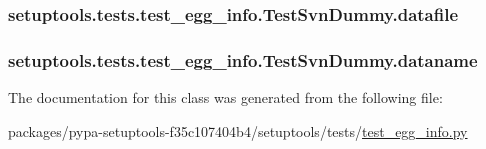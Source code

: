 \subsubsection[{datafile}]{\setlength{\rightskip}{0pt plus 5cm}setuptools.\+tests.\+test\+\_\+egg\+\_\+info.\+Test\+Svn\+Dummy.\+datafile}\label{classsetuptools_1_1tests_1_1test__egg__info_1_1TestSvnDummy_ab48d19e4661cfb140e463bf64197c0cc}
\hypertarget{classsetuptools_1_1tests_1_1test__egg__info_1_1TestSvnDummy_a09528b03ea5f267c9697f4e43770e13d}{}
\subsubsection[{dataname}]{\setlength{\rightskip}{0pt plus 5cm}setuptools.\+tests.\+test\+\_\+egg\+\_\+info.\+Test\+Svn\+Dummy.\+dataname}\label{classsetuptools_1_1tests_1_1test__egg__info_1_1TestSvnDummy_a09528b03ea5f267c9697f4e43770e13d}


The documentation for this class was generated from the following file\+:\begin{DoxyCompactItemize}
\item 
packages/pypa-\/setuptools-\/f35c107404b4/setuptools/tests/\hyperlink{test__egg__info_8py}{test\+\_\+egg\+\_\+info.\+py}\end{DoxyCompactItemize}
